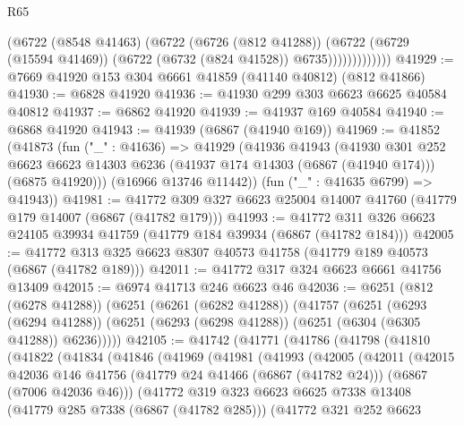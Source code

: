 \begin{lexlean}{R65}
\begin{coremodule}
{                      (@6722
                        (@8548 @41463)
                        (@6722
                          (@6726 (@812 @41288))
                          (@6722
                            (@6729 (@15594 @41469))
                            (@6722 (@6732 (@824 @41528)) @6735)))))))))))))
@41929 := @7669 @41920 @153 @304 @6661 @41859 (@41140 @40812) (@812 @41866)
@41930 := @6828 @41920
@41936 := @41930 @299 @303 @6623 @6625 @40584 @40812
@41937 := @6862 @41920
@41939 := @41937 @169 @40584
@41940 := @6868 @41920
@41943 := @41939 (@6867 (@41940 @169))
@41969 := @41852
    (@41873
      (fun ("_" : @41636) =>
      @41929
        (@41936
          @41943
          (@41930
            @301
            @252
            @6623
            @6623
            @14303
            @6236
            (@41937 @174 @14303 (@6867 (@41940 @174)))
            (@6875 @41920)))
        (@16966 @13746 @11442))
      (fun ("_" : @41635 @6799) => @41943))
@41981 := @41772 @309 @327 @6623 @25004 @14007 @41760 (@41779 @179 @14007 (@6867 (@41782 @179)))
@41993 := @41772 @311 @326 @6623 @24105 @39934 @41759 (@41779 @184 @39934 (@6867 (@41782 @184)))
@42005 := @41772 @313 @325 @6623 @8307 @40573 @41758 (@41779 @189 @40573 (@6867 (@41782 @189)))
@42011 := @41772 @317 @324 @6623 @6661 @41756 @13409
@42015 := @6974 @41713 @246 @6623 @46
@42036 := @6251
    (@812 (@6278 @41288))
    (@6251
      (@6261 (@6282 @41288))
      (@41757
        (@6251
          (@6293 (@6294 @41288))
          (@6251 (@6293 (@6298 @41288)) (@6251 (@6304 (@6305 @41288)) @6236)))))
@42105 := @41742
    (@41771
      (@41786
        (@41798
          (@41810
            (@41822
              (@41834
                (@41846
                  (@41969
                    (@41981
                      (@41993
                        (@42005
                          (@42011
                            (@42015
                              @42036
                              @146
                              @41756
                              (@41779 @24 @41466 (@6867 (@41782 @24)))
                              (@6867 (@7006 @42036 @46)))
                            (@41772
                              @319
                              @323
                              @6623
                              @6625
                              @7338
                              @13408
                              (@41779 @285 @7338 (@6867 (@41782 @285)))
                              (@41772
                                @321
                                @252
                                @6623
}
\end{coremodule}
\end{lexlean}

